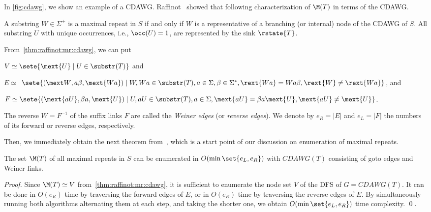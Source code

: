 In \cref{fig:cdawg}, we show an example of a CDAWG.
Raffinot~\cite{raffinot2001maximal} showed that following characterization of $\M(T)$ in terms of the CDAWG. 

\begin{theorem}
  \label{thm:raffinot:mr:cdawg}
  A substring $W \in \Sigma^+$ is a maximal repeat in $S$ if and only if $W$ is a representative of a branching (or internal) node of the CDAWG of $S$. All substring $U$ with unique occurrences, i.e., $\occ(U) = 1$, are represented by the sink $\rstate{T}$. 
\end{theorem}

From~\cref{thm:raffinot:mr:cdawg}, we can put 
\begin{enumerate*}[(i)]
\item $V \simeq \sete{ \mext{U} \mid U \in \substr(T) }$ and 
\item $E \simeq $ $\sete{ ({\mext W}, a\beta, {\mext{Wa}}) \mid W, Wa \in \substr(T), a \in \Sigma, \beta \in \Sigma^*, \rext{Wa} = Wa\beta, \rext{W} \not= \rext{Wa}}$, and 
\item $F \simeq  \sete{ (\mext{aU}, \beta a, \mext{U}) \mid U, aU \in \substr(T), a \in \Sigma, \mext{aU} = \beta a\mext{U}, \mext{aU} \not= \mext{U}}$. 
\end{enumerate*}
The reverse $W = F^{-1}$ of the suffix links $F$ are called the \textit{Weiner edges} (or \textit{reverse edges}). 
We denote by $e_R = |E|$ and $e_L = |F|$ the numbers of its forward or reverse edges, respectively.

Then, we immediately obtain the next theorem from~\cite{raffinot2001maximal}, which is a start point of our discussion on enumeration of maximal repeats. 

\begin{theorem}\label{thm:raffinot:mr:enum}
The set $\M(T)$ of all maximal repeats in $S$ can be enumerated in $O(\min\set{e_L, e_R})$ with $CDAWG(T)$ consisting of goto edges and Weiner links. 
\end{theorem}

\begin{proof}
Since $\M(T) \simeq V$ from~\cref{thm:raffinot:mr:cdawg}, it is sufficient to enumerate the node set $V$ of the DFS of $G = CDAWG(T)$. It can be done in $O(e_R)$ time by traversing the forward edges of $E$, or in $O(e_R)$ time by traversing the reverse edges of $E$. By simultaneously running both algorithms alternating them at each step, and taking the shorter one, we obtain $O(\min\set{e_L, e_R})$ time complexity. \qed. 
\end{proof}


